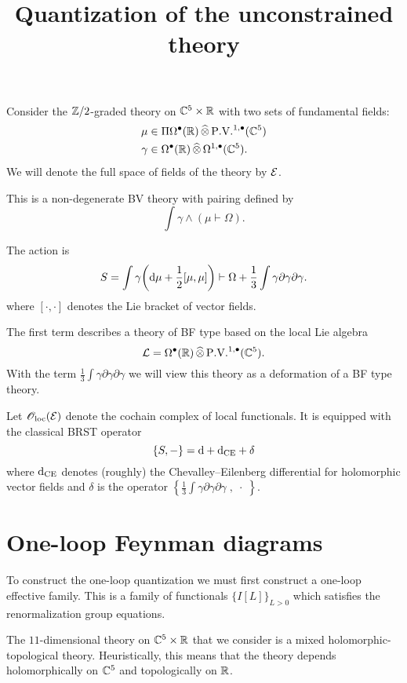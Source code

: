 \documentclass[11pt]{amsart}
\begin{document}
\title{Quantization of the unconstrained theory}

\maketitle

Consider the $\mathbb Z/2$-graded theory on $\mathbb C^5 \times \mathbb R$ with two sets of fundamental fields:
\begin{align*}
\mu & \in \Pi \Omega^\bu (\RR) \, \Hat{\otimes} \, \PV^{1,\bu}(\CC^5) \\
\gamma & \in \Omega^{\bu}(\RR) \, \Hat{\otimes} \, \Omega^{1,\bu}(\CC^5) .
\end{align*}
We will denote the full space of fields of the theory by $\mathcal E$. 

This is a non-degenerate BV theory with pairing defined by
\[
\int \gamma \wedge (\mu \vdash \Omega) .
\] 

The action is 
\[
S = \int \gamma \bigg({\rm d} \mu + \frac12 [\mu, \mu] \bigg) \vdash \Omega + \frac13 \int \gamma \partial \gamma \partial \gamma .
\]
where $[\cdot, \cdot]$ denotes the Lie bracket of vector fields. 

The first term describes a theory of BF type based on the local Lie algebra 
\[
\cL = \Omega^\bu(\RR) \, \Hat{\otimes} \, \PV^{1,\bu}(\CC^5) .
\]
With the term $\frac13\int \gamma \partial \gamma \partial \gamma$ we will view this theory as a deformation of a BF type theory. 

Let ${\mathscr O}_{\rm loc}(\mathcal E)$ denote the cochain complex of local functionals.
It is equipped with the classical BRST operator 
\[
\{S, -\} = {\rm d} + {\rm d}_{\rm CE} + \delta 
\]
where ${\rm d}_{\rm CE}$ denotes (roughly) the Chevalley--Eilenberg differential for holomorphic vector fields and $\delta$ is the operator $\left\{\frac13 \int \gamma \partial \gamma \partial \gamma \;, \; \cdot \; \right\}$. 

\section{One-loop Feynman diagrams}

To construct the one-loop quantization we must first construct a one-loop effective family. 
This is a family of functionals $\{I[L]\}_{L>0}$ which satisfies the renormalization group equations. 

The $11$-dimensional theory on $\mathbb C^5 \times \mathbb R$ that we consider is a mixed holomorphic-topological theory. 
Heuristically, this means that the theory depends holomorphically on $\mathbb C^5$ and topologically on $\mathbb R$. 
\end{document}
